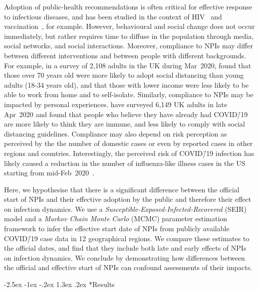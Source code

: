 \documentclass[12pt]{extarticle}
\makeatletter
\renewcommand\section{\@startsection {section}{1}{\z@}%
     {-2.5ex \@plus -1ex \@minus -.2ex}%
     {1.3ex \@plus.2ex}%
    {\Large\bfseries}}
\newcommand{\covid}{COVID\=/19 }
\makeatother
\begin{document}
Adoption of public-health recommendations is often critical for effective response to infectious diseases, and has been studied in the context of HIV~\citep{Kaufman2014} and vaccination~\citep{Dunn2015,Wiyeh2018}, for example.
However, behavioural and social change does not occur immediately, but rather requires time to diffuse in the population through media, social networks, and social interactions. 
Moreover, compliance to NPIs may differ between different interventions and between people with different backgrounds.
For example, in a survey of 2,108 adults in the UK during Mar~2020, \citet{Atchison2020} found that those over 70 years old were more likely to adopt social distancing than young adults (18-34 years old), and that those with lower income were less likely to be able to work from home and to self-isolate.
Similarly, compliance to NPIs may be impacted by personal experiences. \citet{Smith2020} have surveyed 6,149 UK adults in late Apr~2020 and found that people who believe they have already had \covid are more likely to think they are immune, and less likely to comply with social distancing guidelines. 
Compliance may also depend on risk perception as perceived by the the number of domestic cases or even by reported cases in other regions and countries.
Interestingly, the perceived risk of \covid infection has likely caused a reduction in the number of influenza-like illness cases in the US starting from mid-Feb~2020~\citep{Zipfel2020}.

Here, we hypothesise that there is a significant difference between the official start of NPIs and their effective adoption by the public and therefore their effect on infection dynamics.
We use a \textit{Susceptible-Exposed-Infected-Recovered} (SEIR) model and a \textit{Markov Chain Monte Carlo} (MCMC) parameter estimation framework to infer the effective start date of NPIs from publicly available \covid case data in 12 geographical regions.
We compare these estimates to the official dates, and find that they include both late and early effects of NPIs on infection dynamics.
We conclude by demonstrating how differences between the official and effective start of NPIs can confound assessments of their impacts.



\section*{Results}
\end{document}
